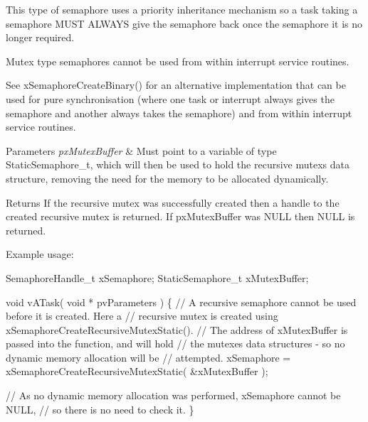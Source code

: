 This type of semaphore uses a priority inheritance mechanism so a task \textquotesingle{}taking\textquotesingle{} a semaphore M\+U\+ST A\+L\+W\+A\+YS \textquotesingle{}give\textquotesingle{} the semaphore back once the semaphore it is no longer required.

Mutex type semaphores cannot be used from within interrupt service routines.

See x\+Semaphore\+Create\+Binary() for an alternative implementation that can be used for pure synchronisation (where one task or interrupt always \textquotesingle{}gives\textquotesingle{} the semaphore and another always \textquotesingle{}takes\textquotesingle{} the semaphore) and from within interrupt service routines.


\begin{DoxyParams}{Parameters}
{\em px\+Mutex\+Buffer} & Must point to a variable of type Static\+Semaphore\+\_\+t, which will then be used to hold the recursive mutex\textquotesingle{}s data structure, removing the need for the memory to be allocated dynamically.\\
\hline
\end{DoxyParams}
\begin{DoxyReturn}{Returns}
If the recursive mutex was successfully created then a handle to the created recursive mutex is returned. If px\+Mutex\+Buffer was N\+U\+LL then N\+U\+LL is returned.
\end{DoxyReturn}
Example usage\+: 
\begin{DoxyPre}
SemaphoreHandle\_t xSemaphore;
StaticSemaphore\_t xMutexBuffer;\end{DoxyPre}



\begin{DoxyPre}void vATask( void * pvParameters )
\{
   // A recursive semaphore cannot be used before it is created.  Here a
   // recursive mutex is created using xSemaphoreCreateRecursiveMutexStatic().
   // The address of xMutexBuffer is passed into the function, and will hold
   // the mutexes data structures - so no dynamic memory allocation will be
   // attempted.
   xSemaphore = xSemaphoreCreateRecursiveMutexStatic( &xMutexBuffer );\end{DoxyPre}



\begin{DoxyPre}   // As no dynamic memory allocation was performed, xSemaphore cannot be NULL,
   // so there is no need to check it.
\}
\end{DoxyPre}
 